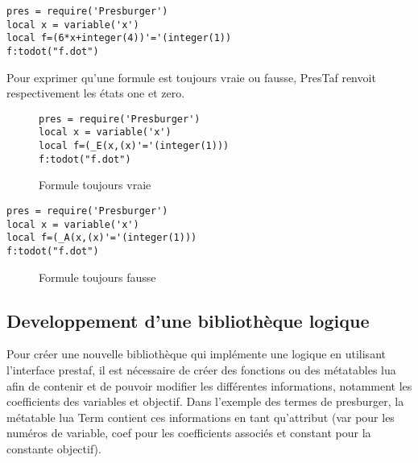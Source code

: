 \begin{lstlisting}[mathescape=true, frame=single]
pres = require('Presburger')
local x = variable('x')
local f=(6*x+integer(4))'='(integer(1))
f:todot("f.dot")
\end{lstlisting}

Pour exprimer qu'une formule est toujours vraie ou fausse, PresTaf renvoit respectivement les états one et zero.
\begin{figure}[h]
\begin{lstlisting}[mathescape=true, frame=single]
pres = require('Presburger')
local x = variable('x')
local f=(_E(x,(x)'='(integer(1)))
f:todot("f.dot")
\end{lstlisting}

\caption{Formule toujours vraie}
\end{figure}


\begin{lstlisting}[mathescape=true, frame=single]
pres = require('Presburger')
local x = variable('x')
local f=(_A(x,(x)'='(integer(1)))
f:todot("f.dot")
\end{lstlisting}

\begin{figure}[h]
\caption{Formule toujours fausse}
\end{figure}

\subsection{ Developpement d’une bibliothèque logique}

Pour créer une nouvelle bibliothèque qui implémente une logique en utilisant l’interface prestaf, il est nécessaire de créer des fonctions ou des métatables lua afin de contenir et de pouvoir modifier les différentes informations, notamment les coefficients des variables et objectif. Dans l’exemple des termes de presburger, la métatable lua Term contient ces informations en tant qu’attribut (var pour les numéros de variable, coef pour les coefficients associés et constant pour la constante objectif).\par

